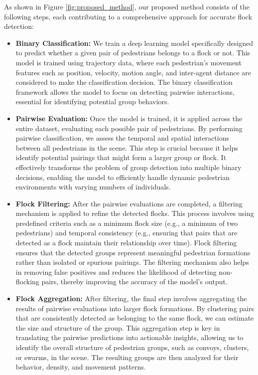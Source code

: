 \documentclass{article}
\begin{document}
As shown in Figure \ref{fig:proposed_method}, our proposed method consists of the following steps, each contributing to a comprehensive approach for accurate flock detection:

\begin{itemize} \item \textbf{Binary Classification:} We train a deep learning model specifically designed to predict whether a given pair of pedestrians belongs to a flock or not. This model is trained using trajectory data, where each pedestrian's movement features such as position, velocity, motion angle, and inter-agent distance are considered to make the classification decision. The binary classification framework allows the model to focus on detecting pairwise interactions, essential for identifying potential group behaviors. \end{itemize}

\begin{itemize} \item \textbf{Pairwise Evaluation:} Once the model is trained, it is applied across the entire dataset, evaluating each possible pair of pedestrians. By performing pairwise classification, we assess the temporal and spatial interactions between all pedestrians in the scene. This step is crucial because it helps identify potential pairings that might form a larger group or flock. It effectively transforms the problem of group detection into multiple binary decisions, enabling the model to efficiently handle dynamic pedestrian environments with varying numbers of individuals. \end{itemize}

\begin{itemize} \item \textbf{Flock Filtering:} After the pairwise evaluations are completed, a filtering mechanism is applied to refine the detected flocks. This process involves using predefined criteria such as a minimum flock size (e.g., a minimum of two pedestrians) and temporal consistency (e.g., ensuring that pairs that are detected as a flock maintain their relationship over time). Flock filtering ensures that the detected groups represent meaningful pedestrian formations rather than isolated or spurious pairings. The filtering mechanism also helps in removing false positives and reduces the likelihood of detecting non-flocking pairs, thereby improving the accuracy of the model's output. \end{itemize}

\begin{itemize} \item \textbf{Flock Aggregation:} After filtering, the final step involves aggregating the results of pairwise evaluations into larger flock formations. By clustering pairs that are consistently detected as belonging to the same flock, we can estimate the size and structure of the group. This aggregation step is key in translating the pairwise predictions into actionable insights, allowing us to identify the overall structure of pedestrian groups, such as convoys, clusters, or swarms, in the scene. The resulting groups are then analyzed for their behavior, density, and movement patterns. \end{itemize}
\end{document}
